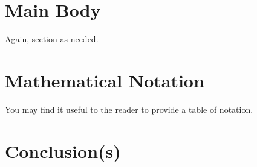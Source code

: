 \documentclass{bcthesis}
\begin{document}
		

\chapter{Main Body}%
\label{sec:structured-writing}

Again, section as needed.

\chapter{Mathematical Notation}%
\label{sec:mathematical-notation}

You may find it useful to the reader to provide a table of notation. 

\chapter{Conclusion(s)}


\backmatter

\nocite{*}


\end{document}
